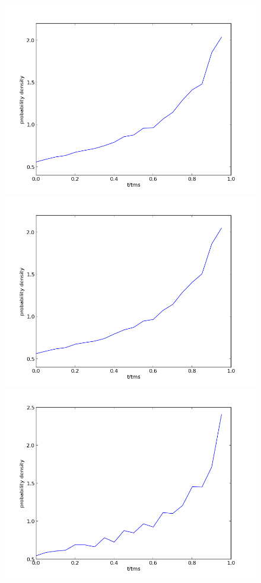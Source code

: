 \documentclass[a4paper,10pt]{article}
\begin{document}
 
 \begin{figure}[h!]
  \begin{minipage}{0.49\textwidth}
   \includegraphics[width=\textwidth]{100-100-100}
  \end{minipage}
  \begin{minipage}{0.49\textwidth}
   \includegraphics[width=\textwidth]{10-100-100}
  \end{minipage}
  \begin{minipage}{0.49\textwidth}
   \includegraphics[width=\textwidth]{100-50-100}

\end{minipage}
\end{figure}
\end{document}
